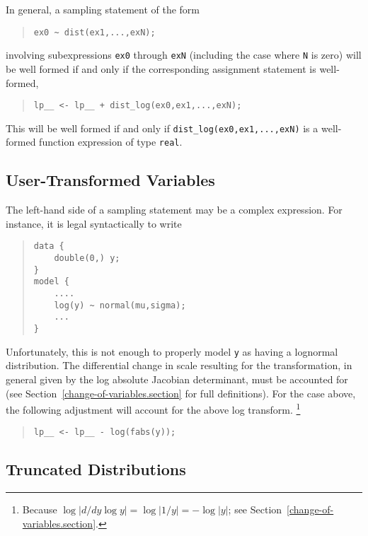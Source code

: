 \documentclass[10pt]{report}
\newcommand{\code}[1]{{\tt #1}}
\newcommand{\refsection}[1]{Section~\ref{#1.section}}
\begin{document}
In general, a sampling statement of the form
%
\begin{quote}
\begin{Verbatim}
ex0 ~ dist(ex1,...,exN);
\end{Verbatim}
\end{quote}
%
involving subexpressions \code{ex0} through \code{exN} (including the
case where \code{N} is zero) will be well formed if and only if the
corresponding assignment statement is well-formed,
%
\begin{quote}
\begin{Verbatim}
lp__ <- lp__ + dist_log(ex0,ex1,...,exN);
\end{Verbatim}
\end{quote}
%
This will be well formed if and only if
\code{dist\_log(ex0,ex1,...,exN)} is a well-formed function expression
of type \code{real}.

\subsection{User-Transformed Variables}

The left-hand side of a sampling statement may be a complex
expression.  For instance, it is legal syntactically to write
%
\begin{quote}
\begin{Verbatim}
data {
    double(0,) y;
}
model {
    ....
    log(y) ~ normal(mu,sigma);
    ...
}
\end{Verbatim}
\end{quote}
%
Unfortunately, this is not enough to properly model \code{y} as having
a lognormal distribution.  The differential change in scale resulting
for the transformation, in general given by the log absolute Jacobian
determinant, must be accounted for (see
\refsection{change-of-variables} for full definitions).  For the case
above, the following adjustment will account for the above log
transform.%
%
\footnote{Because $\log | d/dy \log y | = \log | 1/y | = - \log
  |y|$;  see \refsection{change-of-variables}.}
%
\begin{quote}
\begin{Verbatim}
lp__ <- lp__ - log(fabs(y));
\end{Verbatim}
\end{quote}
%

\subsection{Truncated Distributions}
\end{document}
